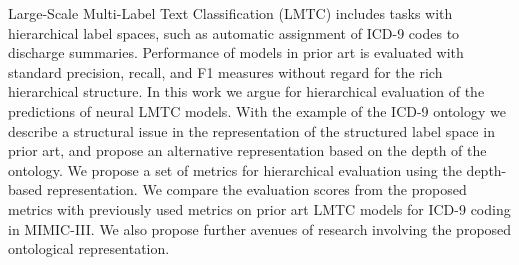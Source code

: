 Large-Scale Multi-Label Text Classification (LMTC) includes tasks with hierarchical label spaces, such as automatic assignment of ICD-9 codes to discharge summaries. Performance of models in prior art is evaluated with standard precision, recall, and F1 measures without regard for the rich hierarchical structure. In this work we argue for hierarchical evaluation of the predictions of neural LMTC models. With the example of the ICD-9 ontology we describe a structural issue in the representation of the structured label space in prior art, and propose an alternative representation based on the depth of the ontology. We propose a set of metrics for hierarchical evaluation using the depth-based representation. We compare the evaluation scores from the proposed metrics with previously used metrics on prior art LMTC models for ICD-9 coding in MIMIC-III. We also propose further avenues of research involving the proposed ontological representation.
